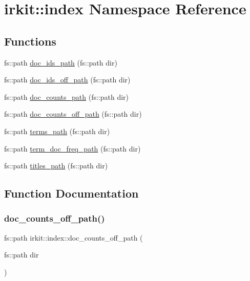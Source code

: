 \hypertarget{namespaceirkit_1_1index}{}\section{irkit\+:\+:index Namespace Reference}
\label{namespaceirkit_1_1index}
\subsection*{Functions}
\begin{DoxyCompactItemize}
\item 
fs\+::path \hyperlink{namespaceirkit_1_1index_aab3491ded0cd4660b55f6c8f8c289428}{doc\+\_\+ids\+\_\+path} (fs\+::path dir)
\item 
fs\+::path \hyperlink{namespaceirkit_1_1index_a86d50e7aaf2bbdebf3e7a71623f4706e}{doc\+\_\+ids\+\_\+off\+\_\+path} (fs\+::path dir)
\item 
fs\+::path \hyperlink{namespaceirkit_1_1index_a5146ae382a6daf964681a09c55cdce93}{doc\+\_\+counts\+\_\+path} (fs\+::path dir)
\item 
fs\+::path \hyperlink{namespaceirkit_1_1index_a161f08dc57d21f41a9c03c7f97646e76}{doc\+\_\+counts\+\_\+off\+\_\+path} (fs\+::path dir)
\item 
fs\+::path \hyperlink{namespaceirkit_1_1index_ad05e7b96e9fec4cb7f93df6ea934c063}{terms\+\_\+path} (fs\+::path dir)
\item 
fs\+::path \hyperlink{namespaceirkit_1_1index_a28db3dab0a7fd926c5a4e6a4d37755c3}{term\+\_\+doc\+\_\+freq\+\_\+path} (fs\+::path dir)
\item 
fs\+::path \hyperlink{namespaceirkit_1_1index_a556d5fca1ddd33b4c09cd470ad7f9861}{titles\+\_\+path} (fs\+::path dir)
\end{DoxyCompactItemize}


\subsection{Function Documentation}
\mbox{\label{namespaceirkit_1_1index_a161f08dc57d21f41a9c03c7f97646e76}} 
\subsubsection{\texorpdfstring{doc\+\_\+counts\+\_\+off\+\_\+path()}{doc\_counts\_off\_path()}}
{\footnotesize\ttfamily fs\+::path irkit\+::index\+::doc\+\_\+counts\+\_\+off\+\_\+path (\begin{DoxyParamCaption}\item[{fs\+::path}]{dir }\end{DoxyParamCaption})}

